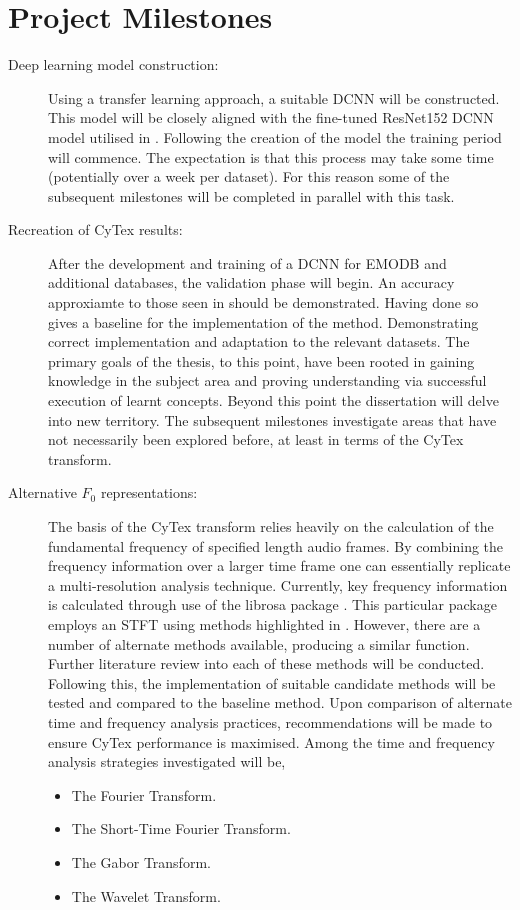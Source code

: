 \section{Project Milestones}
\begin{description}
\item[Deep learning model construction:]
Using a transfer learning approach, a suitable DCNN will be constructed. This model will be closely aligned with the fine-tuned ResNet152 DCNN model utilised in \cite{CyTexRef}. Following the creation of the model the training period will commence. The expectation is that this process may take some time (potentially over a week per dataset). For this reason some of the subsequent milestones will be completed in parallel with this task.

\item[Recreation of CyTex results:]
After the development and training of a DCNN for EMODB and additional databases, the validation phase will begin. An accuracy approxiamte to those seen in \cite{CyTexRef}
should be demonstrated. Having done so gives a baseline for the implementation of the method. Demonstrating correct implementation and adaptation to the relevant datasets. The primary goals of the thesis, to this point, have been rooted in gaining knowledge in the subject area and proving understanding via successful execution of learnt concepts. Beyond this point the dissertation will delve into new territory. The subsequent milestones investigate areas that have not necessarily been explored before, at least in terms of the CyTex transform. 

\item[Alternative $F_0$ representations:]
The basis of the CyTex transform relies heavily on the calculation of the fundamental frequency of specified length audio frames. By combining the frequency information over a larger time frame one can essentially replicate a multi-resolution analysis technique. Currently, key frequency information is calculated through use of the librosa package \cite{mcfee2015librosa}. This particular package employs an STFT using methods highlighted in \cite{SASPWEB2011_stanford}. However, there are a number of alternate methods available, producing a similar function. Further literature review into each of these methods will be conducted. Following this, the implementation of suitable candidate methods will be tested and compared to the baseline method. Upon comparison of alternate time and frequency analysis practices, recommendations will be made to ensure CyTex performance is maximised. Among the time and frequency analysis strategies investigated will be,
\begin{itemize}
    \item The Fourier Transform.
    \item The Short-Time Fourier Transform.
    \item The Gabor Transform.
    \item The Wavelet Transform.
\end{itemize}


\end{description}
